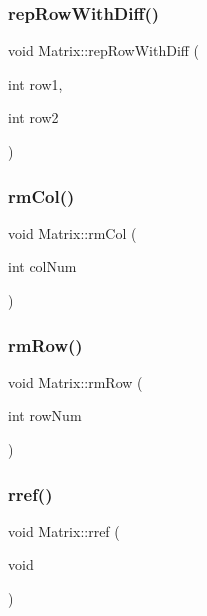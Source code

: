 \subsubsection{\texorpdfstring{rep\+Row\+With\+Diff()}{repRowWithDiff()}}
{\footnotesize\ttfamily void Matrix\+::rep\+Row\+With\+Diff (\begin{DoxyParamCaption}\item[{int}]{row1,  }\item[{int}]{row2 }\end{DoxyParamCaption})}

\mbox{\label{class_matrix_ac47f9d15d021312e0a33a341cc1e8032}} 
\subsubsection{\texorpdfstring{rm\+Col()}{rmCol()}}
{\footnotesize\ttfamily void Matrix\+::rm\+Col (\begin{DoxyParamCaption}\item[{int}]{col\+Num }\end{DoxyParamCaption})}

\mbox{\label{class_matrix_aab389448930cfd4b32158aa58ef5f87a}} 
\subsubsection{\texorpdfstring{rm\+Row()}{rmRow()}}
{\footnotesize\ttfamily void Matrix\+::rm\+Row (\begin{DoxyParamCaption}\item[{int}]{row\+Num }\end{DoxyParamCaption})}

\mbox{\label{class_matrix_a5510abd211511ab980d69b160d742f78}} 
\subsubsection{\texorpdfstring{rref()}{rref()}}
{\footnotesize\ttfamily void Matrix\+::rref (\begin{DoxyParamCaption}\item[{void}]{ }\end{DoxyParamCaption})}

